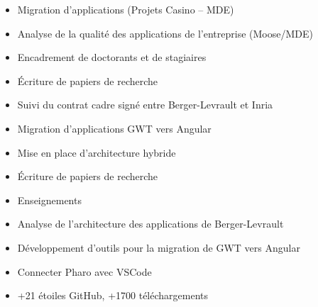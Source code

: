 \documentclass[10pt,a4paper,ragged2e,withhyper]{altacv}
\begin{document}
\begin{paracol}{2}


\begin{itemize}
  \item Migration d'applications (Projets Casino -- MDE)
  \item Analyse de la qualité des applications de l'entreprise (Moose/MDE)
  \item Encadrement de doctorants et de stagiaires
  \item Écriture de papiers de recherche
  \item Suivi du contrat cadre signé entre Berger-Levrault et Inria
\end{itemize}

\divider

\begin{itemize}
  \item Migration d'applications GWT vers Angular
  \item Mise en place d'architecture hybride
  \item Écriture de papiers de recherche
  \item Enseignements
\end{itemize}

\divider

\begin{itemize}
  \item Analyse de l’architecture des applications de Berger-Levrault
  \item Développement d'outils pour la migration de GWT vers Angular
\end{itemize}

\divider




\begin{itemize}
\item Connecter Pharo avec VSCode
\item +21 étoiles GitHub, +1700 téléchargements
\end{itemize}


\end{paracol}
\end{document}
